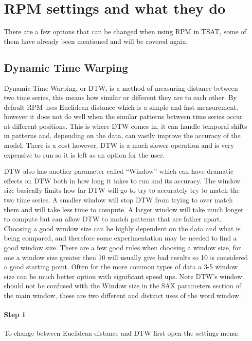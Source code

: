 \documentclass[letterpaper, 12pt]{article}
\begin{document}
\newpage
\section{RPM settings and what they do}
There are a few options that can be changed when using RPM in TSAT, some of them have already been mentioned and will be covered again.

\subsection{Dynamic Time Warping}
Dynamic Time Warping, or DTW, is a method of measuring distance between two time series, this means how similar or different they are to each other. By default RPM uses Euclidean distance which is a simple and fast measurement, however it does not do well when the similar patterns between time series occur at different positions. This is where DTW comes in, it can handle temporal shifts in patterns and, depending on the data, can vastly improve the accuracy of the model. There is a cost however, DTW is a much slower operation and is very expensive to run so it is left as an option for the user. 

DTW also has another parameter called ``Window'' which can have dramatic effects on DTW both in how long it takes to run and its accuracy. The window size basically limits how far DTW will go to try to accurately try to match the two time series. A smaller window will stop DTW from trying to over match them and will take less time to compute. A larger window will take much longer to compute but can allow DTW to match patterns that are father apart. Choosing a good window size can be highly dependent on the data and what is being compared, and therefore some experimentation may be needed to find a good window size. There are a few good rules when choosing a window size, for one a window size greater then 10 will usually give bad results so 10 is considered a good starting point. Often for the more common types of data a 3-5 window size can be much better option with significant speed ups. Note DTW's window should not be confused with the Window size in the SAX parameters section of the main window, these are two different and distinct uses of the word window. 

\newpage
\paragraph{Step 1}
To change between Euclidean distance and DTW first open the settings menu:
\end{document}
